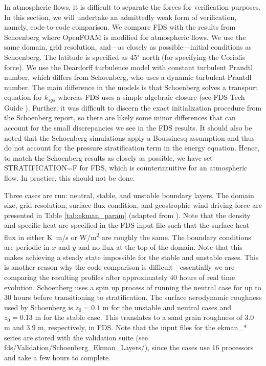 \documentclass[11pt]{book}
\begin{document}
In atmospheric flows, it is difficult to separate the forces for verification purposes.  In this section, we will undertake an admittedly weak form of verification, namely, code-to-code comparison.  We compare FDS with the results from Schoenberg \cite{Schoenberg:2004} where OpenFOAM is modified for atmospheric flows.  We use the same domain, grid resolution, and---as closely as possible---initial conditions as Schoenberg.  The latitude is specified as 45$^\circ$ north (for specifying the Coriolis force).  We use the Deardorff turbulence model with constant turbulent Prandtl number, which differs from Schoenberg, who uses a dynamic turbulent Prantdl number.  The main difference in the models is that Schoenberg solves a transport equation for $k_{sgs}$ whereas FDS uses a simple algebraic closure (see FDS Tech Guide \cite{FDS_Math_Guide}).  Further, it was difficult to discern the exact initialization procedure from the Schoenberg report, so there are likely some minor differences that can account for the small discrepancies we see in the FDS results.  It should also be noted that the Schoenberg simulations apply a Boussinesq assumption and thus do not account for the pressure stratification term in the energy equation.  Hence, to match the Schoenberg results as closely as possible, we have set {\ct STRATIFICATION=F} for FDS, which is counterintuitive for an atmospheric flow.  In practice, this should not be done.

Three cases are run: neutral, stable, and unstable boundary layers.  The domain size, grid resolution, surface flux condition, and geostrophic wind driving force are presented in Table \ref{tab:ekman_param} (adapted from \cite{Schoenberg:2004}). Note that the density and specific heat are specified in the FDS input file such that the surface heat flux in either \si{K.m/s} or \si{W/m^2} are roughly the same.  The boundary conditions are periodic in $x$ and $y$ and no flux at the top of the domain.  Note that this makes achieving a steady state impossible for the stable and unstable cases.  This is another reason why the code comparison is difficult---essentially we are comparing the resulting profiles after approximately 40 hours of real time evolution.  Schoenberg uses a spin up process of running the neutral case for up to 30 hours before transitioning to stratification.  The surface aerodynamic roughness used by Schoenberg is $z_0 = 0.1$ m for the unstable and neutral cases and $z_0 = 0.13$ m for the stable case.  This translates to a sand grain roughness of 3.0 m and 3.9 m, respectively, in FDS.  Note that the input files for the {\ct ekman\_*} series are stored with the validation suite (see {\ct fds/Validation/Schoenberg\_Ekman\_Layers/}), since the cases use 16 processors and take a few hours to complete.
\end{document}
